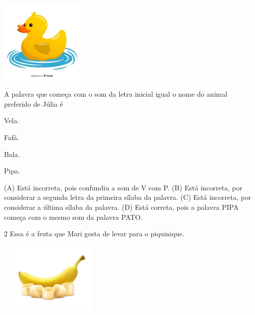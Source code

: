 \includegraphics[width=1.58974in,height=1.58974in]{media/image174.jpeg}


A palavra que começa com o som da letra inicial igual o nome do animal preferido de Júlia é

\begin{minipage}{.5\textwidth}
\begin{escolha}
\item Vela.

\item Fafá.

\item Bala.

\item Pipa.
\end{escolha}
\end{minipage}

(A) Está incorreta, pois confundiu a som de V com P.
(B) Está incorreta, por considerar a segunda letra da primeira sílaba da palavra.
(C) Está incorreta, por considerar a última sílaba da palavra.
(D) Está correta, pois a palavra PIPA começa com o mesmo som da palavra PATO.

\num{2} Essa é a fruta que Mari gosta de levar para o piquinique.

\includegraphics[width=1.96704in,height=1.37153in]{media/image175.jpeg}

